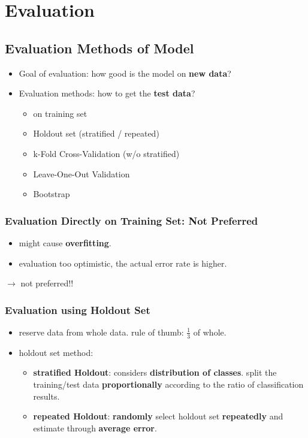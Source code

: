 \section{Evaluation}
\subsection{Evaluation Methods of Model}
\begin{itemize}
	\item Goal of evaluation: how good is the model on \textbf{new data}?
	\item Evaluation methods: how to get the \textbf{test data}?
	\begin{itemize}
		\item on training set
		\item Holdout set (stratified / repeated)
		\item k-Fold Cross-Validation (w/o stratified)
		\item Leave-One-Out Validation 
		\item Bootstrap
	\end{itemize}
\end{itemize}

\subsubsection{Evaluation Directly on Training Set: Not Preferred}
\begin{itemize}
	\item might cause \textbf{overfitting}.
	\item evaluation too optimistic, the actual error rate is higher.
\end{itemize}
$\rightarrow$ not preferred!!

\subsubsection{Evaluation using Holdout Set}
\begin{itemize}
	\item reserve data from whole data. rule of thumb: $\frac{1}{3}$ of whole.
	\item holdout set method:
	\begin{itemize}
		\item \textbf{stratified Holdout}: considers \textbf{distribution of classes}. split the training/test data \textbf{proportionally} according to the ratio of classification results. 
		\item \textbf{repeated Holdout}: \textbf{randomly} select holdout set \textbf{repeatedly} and estimate through \textbf{average error}.
	\end{itemize}
\end{itemize}

